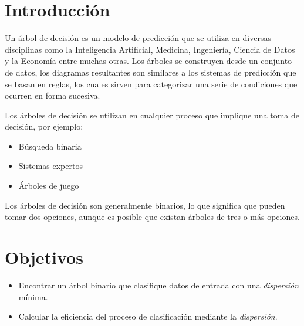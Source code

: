 \documentclass[
10pt, %
a4paper, %
]{article}
\begin{document}
\pagestyle{myheadings} %


\thispagestyle{plain} %

\printtitle %


\section{Introducción}

Un árbol de decisión es un modelo de predicción que se utiliza en diversas disciplinas como la Inteligencia Artificial, Medicina, Ingeniería, Ciencia de Datos y 
la Economía entre muchas otras. Los árboles se construyen desde un conjunto de datos, los diagramas resultantes son similares a los sistemas de predicción que se basan
en reglas, los cuales sirven para categorizar una serie de condiciones que ocurren en forma sucesiva.

Los árboles de decisión se utilizan en cualquier proceso que implique una toma de decisión, por ejemplo:
\begin{itemize}
	\item Búsqueda binaria
	\item Sistemas expertos
	\item Árboles de juego
\end{itemize}

Los árboles de decisión son generalmente binarios, lo que significa que pueden tomar dos opciones, aunque es posible que existan árboles de tres o más opciones.


\section{Objetivos} %

\begin{itemize}
	\item Encontrar un árbol binario que clasifique datos de entrada con una \textit{dispersión} mínima.
	\item Calcular la eficiencia del proceso de clasificación mediante la \textit{dispersión}.
\end{itemize}
\end{document}
